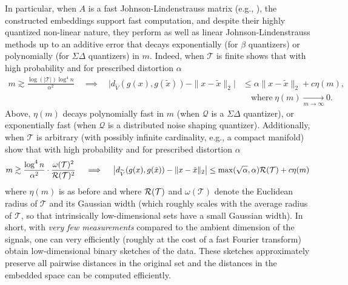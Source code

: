 In particular, when $A$ is a fast Johnson-Lindenstrauss matrix (e.g., \cite{}), the constructed embeddings support fast computation, and despite their highly quantized non-linear nature, they perform as well as linear Johnson-Lindenstrauss methods up to an additive error that decays exponentially (for $\beta$ quantizers) or polynomially (for $\Sigma\Delta$ quantizers)  in $m$. 
{Indeed, when $\mathcal{T}$ is finite} \cite{huynh2018fast} shows that with high probability %
and for prescribed distortion $\alpha$
\begin{align*} m \gtrsim \frac{\log{(|\mathcal{T}|)} \log^4 n}{\alpha^2} \quad \implies  \quad \big|d_{\widetilde{V}}(g(x), g(\tilde{x})) - \|x - \tilde{x}\|_2\big| & \leq {\alpha}\|x - \tilde{x}\|_2 + c\eta(m), \\ &\quad\text{where} \ \eta(m) \xrightarrow[m \rightarrow \infty]{} 0. \end{align*}
Above, $\eta(m)$ decays polynomially fast in $m$ (when $\mathcal{Q}$ is a $\Sigma\Delta$ quantizer), or exponentially fast (when $\mathcal{Q}$ is a distributed noise shaping quantizer). %
{Additionally, when $\mathcal{T}$ is arbitrary (with possibly infinite cardinality, e.g., a compact manifold)} \cite{huynh2018fast} show that with high probability  and for prescribed distortion $\alpha$
\[ m \gtrsim \frac{\log^4 n}{\alpha^2}\cdot\frac{\omega(\mathcal{T})^2}{\mathcal{R}(\mathcal{T})^2} \quad \implies \quad \big|d_{\widetilde{V}}(g(x), g(\tilde{x})) - \|x - \tilde{x}\|_2\big| \leq \max(\sqrt{\alpha},\alpha) \mathcal{R}(\mathcal{T}) + c\eta(m)\]
where $\eta(m)$ is as before and where $\mathcal{R}(\mathcal{T})$ and $\omega(\mathcal{T})$ denote  the Euclidean radius of  $\mathcal{T}$ and its Gaussian width (which roughly scales with the average radius of $\mathcal{T}$, so that intrinsically low-dimensional sets have a small Gaussian width). %
 In short, with \emph{very few measurements} compared to the ambient dimension of the signals, one can very efficiently (roughly at the cost of a fast Fourier transform) obtain low-dimensional binary sketches of the data. These sketches approximately preserve all pairwise distances in the original set and the distances in the embedded space can be computed efficiently.  

